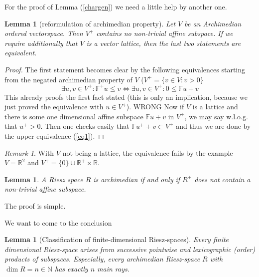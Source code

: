 \documentclass{article}
\newtheorem{lemma}[theorem]{Lemma}
\theoremstyle{definition}
\theoremstyle{remark}
\newtheorem{remark}[theorem]{Remark}
\newcommand{\reels}{\mathbb{R}}  %
\newcommand{\nats}{\mathbb{N}} %
\newcommand{\field}{\mathbb{F}}
\newcommand{\equival}{\Leftrightarrow}
\begin{document}
For the proof of Lemma (\ref{chargen}) we need a little help by another one.

\begin{lemma}[reformulation of archimedian property] Let $V$ be an Archimedian ordered vectorspace. Then $V^+$ contains no non-trivial affine subspace. If we require additionally that $V$ is a vector lattice, then the last two statements are equivalent. 
\end{lemma}

\begin{proof}
The first statement becomes clear by the following equivalences starting from the negated archimedian property of $V$ ($V^+=\{v\in V:v>0\}$
\begin{equation}
{\exists u,v\in V^+:\field^+ u \leq v}\equival {\exists u,v\in V^+:0\leq \field u + v}\label{eq1}
\end{equation}
This already proofs the first fact stated (this is only an implication, because we just proved the equivalence with $u\in V^+$). WRONG Now if $V$ is a lattice and there is some one dimensional affine subspace $\field u+v$ in $V^+$, we may say w.l.o.g. that $u^+>0$. Then one checks easily that $\field u^+ + v\subset V^+$ and thus we are done by the upper equivalence (\ref{eq1}).  
\end{proof}

\begin{remark}
With $V$ not being a lattice, the equivalence fails by the example $V=\reels^2$ and $V^+=\{0\}\cup \reels^+\times \reels$.
\end{remark}

\begin{lemma}
A Riesz space $R$ is archimedian if and only if $R^+$ does not contain a non-trivial affine subspace.
\end{lemma}

The proof is simple.

We want to come to the conclusion 

\begin{lemma}[Classification of finite-dimensional Riesz-spaces] Every finite dimensional Riesz-space arises from successive pointwise and lexicographic (order) products of subspaces. Especially, every archimedian Riesz-space $R$ with $\dim{R}=n\in\nats$ has exactly $n$ main rays.
\end{lemma}
\end{document}
